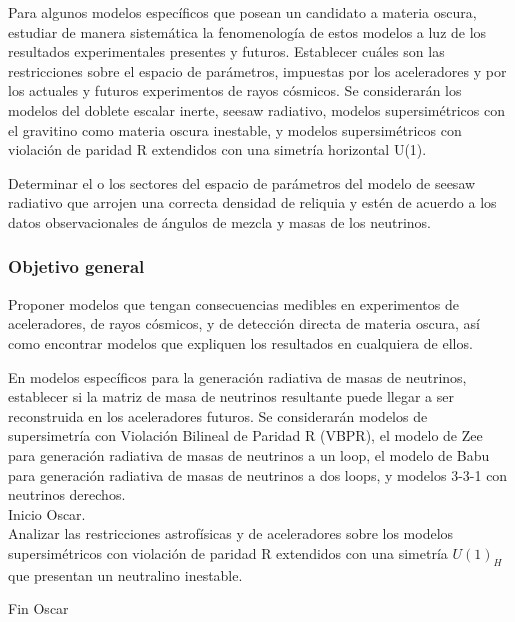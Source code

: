\begin{ideas}
  

\newpage{}

Para algunos modelos específicos que posean un candidato a materia oscura, estudiar de manera sistemática la fenomenología de estos modelos a luz de los resultados experimentales presentes y futuros. Establecer cuáles son las restricciones sobre el espacio de parámetros, impuestas por los aceleradores y por los actuales y futuros experimentos de rayos cósmicos. Se considerarán los modelos del doblete escalar inerte,  seesaw radiativo, modelos supersimétricos con el gravitino como materia oscura inestable,  y modelos supersimétricos con violación de paridad R extendidos con una simetría horizontal U(1).



Determinar el o los sectores del espacio de parámetros del modelo de seesaw radiativo que arrojen una correcta densidad 
de reliquia y estén de acuerdo a los datos observacionales de ángulos de mezcla y masas de los neutrinos.	



\subsubsection{Objetivo general}
Proponer modelos que tengan consecuencias medibles en experimentos de aceleradores, de rayos cósmicos, y de detección directa de materia oscura, así como encontrar modelos que expliquen los resultados en cualquiera de ellos. 

En modelos específicos para la generación radiativa de masas de neutrinos, establecer si la matriz de masa de neutrinos resultante puede llegar a ser reconstruida en los aceleradores futuros. Se considerarán modelos de supersimetría con Violación Bilineal de Paridad R (VBPR), el modelo de Zee para generación radiativa de masas
de neutrinos a un loop, el modelo de Babu para generación radiativa de
masas de neutrinos a dos loops, y modelos 3-3-1 con neutrinos
derechos.
\vspace{4cm}
\\
Inicio Oscar.\\
Analizar las restricciones astrofísicas y de aceleradores sobre los modelos supersimétricos 
con violación de paridad R extendidos con una simetría $U(1)_H$ que presentan un neutralino inestable.

Fin Oscar

\end{ideas}



